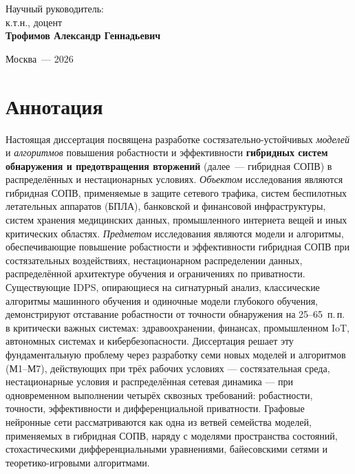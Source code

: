 \begin{titlepage}
\begin{center}
\end{center}

\vspace{2.2cm}

\hfill
\begin{minipage}{0.55\textwidth}
\small
Научный руководитель:\\
к.т.н., доцент\\
\textbf{Трофимов Александр Геннадьевич}
\end{minipage}

\vfill

\begin{center}
Москва~--- 2026
\end{center}
\end{titlepage}

\chapter*{Аннотация}

Настоящая диссертация посвящена разработке состязательно-устойчивых \emph{моделей} и \emph{алгоритмов} повышения робастности и эффективности \textbf{гибридных систем обнаружения и предотвращения вторжений} (далее~--- гибридная СОПВ) в распределённых и нестационарных условиях. \emph{Объектом} исследования являются гибридная СОПВ, применяемые в защите сетевого трафика, систем беспилотных летательных аппаратов (БПЛА), банковской и финансовой инфраструктуры, систем хранения медицинских данных, промышленного интернета вещей и иных критических областях. \emph{Предметом} исследования являются модели и алгоритмы, обеспечивающие повышение робастности и эффективности гибридная СОПВ при состязательных воздействиях, нестационарном распределении данных, распределённой архитектуре обучения и ограничениях по приватности. Существующие IDPS, опирающиеся на сигнатурный анализ, классические алгоритмы машинного обучения и одиночные модели глубокого обучения, демонстрируют отставание робастности от точности обнаружения на 25--65~п.\,п. в критически важных системах: здравоохранении, финансах, промышленном IoT, автономных системах и кибербезопасности. Диссертация решает эту фундаментальную проблему через разработку семи новых моделей и алгоритмов (М1--М7), действующих при трёх рабочих условиях --- состязательная среда, нестационарные условия и распределённая сетевая динамика --- при одновременном выполнении четырёх сквозных требований: робастности, точности, эффективности и дифференциальной приватности. Графовые нейронные сети рассматриваются как одна из ветвей семейства моделей, применяемых в гибридная СОПВ, наряду с моделями пространства состояний, стохастическими дифференциальными уравнениями, байесовскими сетями и теоретико-игровыми алгоритмами.

